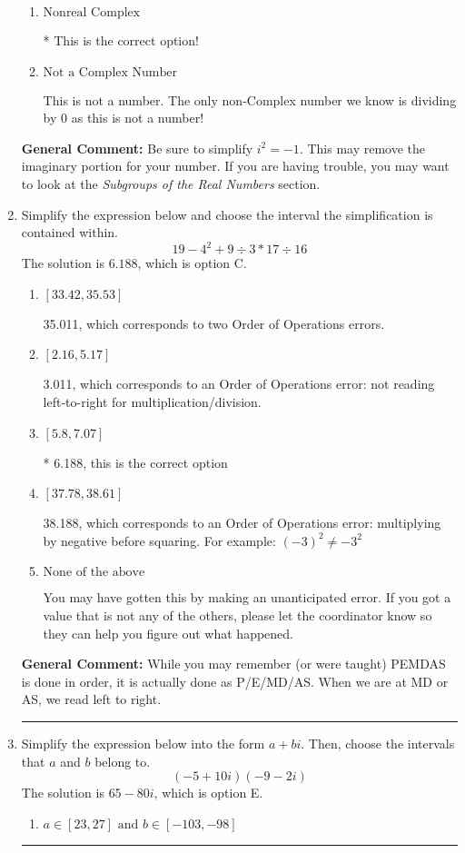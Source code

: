 \documentclass{extbook}[14pt]
\newcommand{\litem}[1]{\item #1

\rule{\textwidth}{0.4pt}}
\begin{document}
\begin{enumerate}
{\begin{enumerate}[label=\Alph*.]
These are numbers that can be written as fraction of Integers (e.g., -2/3 + 5)
\item \( \text{Nonreal Complex} \)

* This is the correct option!
\item \( \text{Not a Complex Number} \)

This is not a number. The only non-Complex number we know is dividing by 0 as this is not a number!
\end{enumerate}

\textbf{General Comment:} Be sure to simplify $i^2 = -1$. This may remove the imaginary portion for your number. If you are having trouble, you may want to look at the \textit{Subgroups of the Real Numbers} section.
}
\litem{
Simplify the expression below and choose the interval the simplification is contained within.
\[ 19 - 4^2 + 9 \div 3 * 17 \div 16 \]The solution is \( 6.188 \), which is option C.\begin{enumerate}[label=\Alph*.]
\item \( [33.42, 35.53] \)

 35.011, which corresponds to two Order of Operations errors.
\item \( [2.16, 5.17] \)

 3.011, which corresponds to an Order of Operations error: not reading left-to-right for multiplication/division.
\item \( [5.8, 7.07] \)

* 6.188, this is the correct option
\item \( [37.78, 38.61] \)

 38.188, which corresponds to an Order of Operations error: multiplying by negative before squaring. For example: $(-3)^2 \neq -3^2$
\item \( \text{None of the above} \)

 You may have gotten this by making an unanticipated error. If you got a value that is not any of the others, please let the coordinator know so they can help you figure out what happened.
\end{enumerate}

\textbf{General Comment:} While you may remember (or were taught) PEMDAS is done in order, it is actually done as P/E/MD/AS. When we are at MD or AS, we read left to right.
}
\litem{
Simplify the expression below into the form $a+bi$. Then, choose the intervals that $a$ and $b$ belong to.
\[ (-5 + 10 i)(-9 - 2 i) \]The solution is \( 65 - 80 i \), which is option E.\begin{enumerate}[label=\Alph*.]
\item \( a \in [23, 27] \text{ and } b \in [-103, -98] \)


\end{enumerate}}
\end{enumerate}
\end{document}
